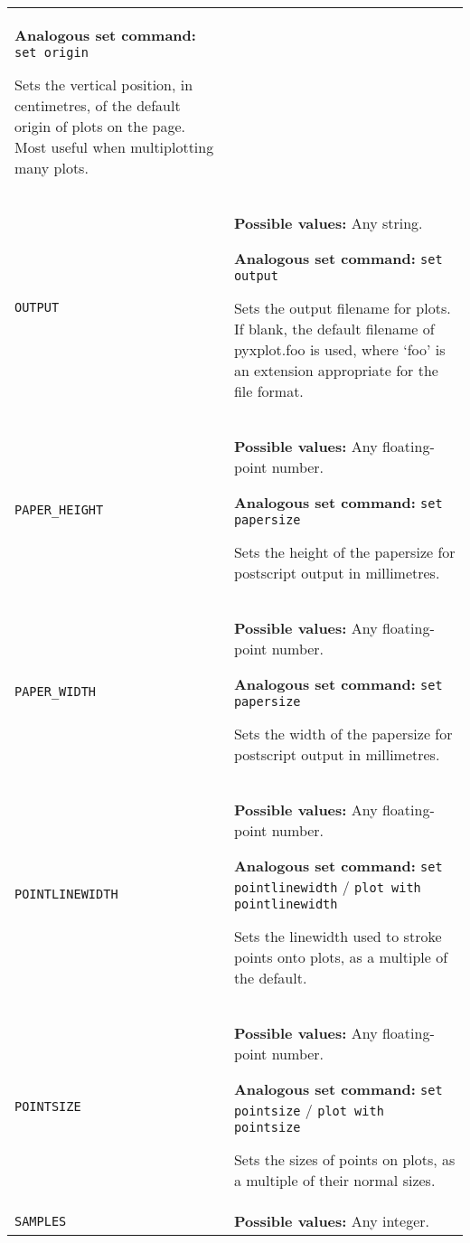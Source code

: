 \begin{longtable}{p{3.4cm}p{9cm}}
                   \textbf{Analogous set command:} \texttt{set origin}\index{set origin command@\texttt{set origin} command}

                   Sets the vertical position, in centimetres, of the default origin of plots on the page. Most useful when multiplotting many plots.
                   \\
\texttt{OUTPUT} & \textbf{Possible values:} Any string.

                   \textbf{Analogous set command:} \texttt{set output}\index{set output command@\texttt{set output} command}

                   Sets the output filename for plots. If blank, the default filename of pyxplot.foo is used, where `foo' is an extension appropriate for the file format.
                   \\
\texttt{PAPER\_HEIGHT} & \textbf{Possible values:} Any floating-point number.

                   \textbf{Analogous set command:} \texttt{set papersize}\index{set papersize command@\texttt{set papersize} command}

                   Sets the height of the papersize for postscript output in millimetres.
                   \\
\texttt{PAPER\_WIDTH} & \textbf{Possible values:} Any floating-point number.

                   \textbf{Analogous set command:} \texttt{set papersize}\index{set papersize command@\texttt{set papersize} command}

                   Sets the width of the papersize for postscript output in millimetres.
                   \\
\texttt{POINTLINEWIDTH} & \textbf{Possible values:} Any floating-point number.

                   \textbf{Analogous set command:} \texttt{set pointlinewidth} / \texttt{plot with pointlinewidth}\index{set pointlinewidth command@\texttt{set pointlinewidth} command}

                   Sets the linewidth used to stroke points onto plots, as a multiple of the default.
                   \\
\texttt{POINTSIZE} & \textbf{Possible values:} Any floating-point number.

                   \textbf{Analogous set command:} \texttt{set pointsize} / \texttt{plot with pointsize}\index{set pointsize command@\texttt{set pointsize} command}

                   Sets the sizes of points on plots, as a multiple of their normal sizes.
                   \\
\texttt{SAMPLES} & \textbf{Possible values:} Any integer.


\end{longtable}
